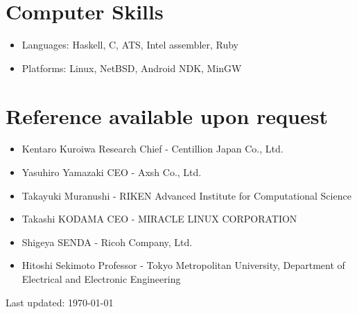 \documentclass[letterpaper]{article}
\def\footer{
  \begin{center}
    \begin{footnotesize}
      Last updated: \today
    \end{footnotesize}
  \end{center}
}
\begin{document}
\section*{Computer Skills}

\begin{itemize}
  \item Languages: Haskell, C, ATS, Intel assembler, Ruby
  \item Platforms: Linux, NetBSD, Android NDK, MinGW
\end{itemize}

\section*{Reference available upon request}

\begin{itemize}
  \item Kentaro Kuroiwa Research Chief - Centillion Japan Co., Ltd.
  \item Yasuhiro Yamazaki CEO - Axsh Co., Ltd.
  \item Takayuki Muranushi - RIKEN Advanced Institute for Computational Science
  \item Takashi KODAMA CEO - MIRACLE LINUX CORPORATION
  \item Shigeya SENDA - Ricoh Company, Ltd.
  \item Hitoshi Sekimoto Professor - Tokyo Metropolitan University, Department of Electrical and Electronic Engineering
\end{itemize}

\bigskip
\footer
\end{document}
